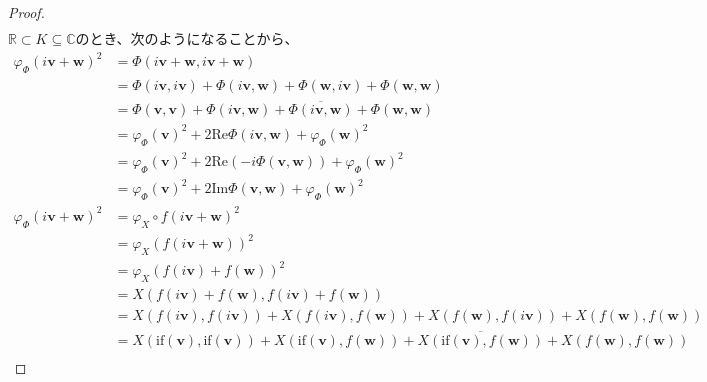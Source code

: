 \documentclass[dvipdfmx]{jsarticle}
\begin{document}
\begin{proof}
\begin{align*}
\end{align*}
$\mathbb{R} \subset K \subseteq \mathbb{C}$のとき、次のようになることから、
\begin{align*}
{\varphi_{\varPhi }\left( i\mathbf{v} + \mathbf{w} \right)}^{2} &= \varPhi \left( i\mathbf{v} + \mathbf{w},i\mathbf{v} + \mathbf{w} \right)\\
&= \varPhi \left( i\mathbf{v},i\mathbf{v} \right) + \varPhi \left( i\mathbf{v},\mathbf{w} \right) + \varPhi \left( \mathbf{w},i\mathbf{v} \right) + \varPhi \left( \mathbf{w},\mathbf{w} \right)\\
&= \varPhi \left( \mathbf{v},\mathbf{v} \right) + \varPhi \left( i\mathbf{v},\mathbf{w} \right) + \overline{\varPhi \left( i\mathbf{v},\mathbf{w} \right)} + \varPhi \left( \mathbf{w},\mathbf{w} \right)\\
&= {\varphi_{\varPhi }\left( \mathbf{v} \right)}^{2} + 2\mathrm{Re}{\varPhi \left( i\mathbf{v},\mathbf{w} \right)} + {\varphi_{\varPhi }\left( \mathbf{w} \right)}^{2}\\
&= {\varphi_{\varPhi }\left( \mathbf{v} \right)}^{2} + 2\mathrm{Re}\left( - i\varPhi \left( \mathbf{v},\mathbf{w} \right) \right) + {\varphi_{\varPhi }\left( \mathbf{w} \right)}^{2}\\
&= {\varphi_{\varPhi }\left( \mathbf{v} \right)}^{2} + 2\mathrm{Im}{\varPhi \left( \mathbf{v},\mathbf{w} \right)} + {\varphi_{\varPhi }\left( \mathbf{w} \right)}^{2}\\
{\varphi_{\varPhi }\left( i\mathbf{v} + \mathbf{w} \right)}^{2} &= {\varphi_{X} \circ f\left( i\mathbf{v} + \mathbf{w} \right)}^{2}\\
&= {\varphi_{X}\left( f\left( i\mathbf{v} + \mathbf{w} \right) \right)}^{2}\\
&= {\varphi_{X}\left( f\left( i\mathbf{v} \right) + f\left( \mathbf{w} \right) \right)}^{2}\\
&= X\left( f\left( i\mathbf{v} \right) + f\left( \mathbf{w} \right),f\left( i\mathbf{v} \right) + f\left( \mathbf{w} \right) \right)\\
&= X\left( f\left( i\mathbf{v} \right),f\left( i\mathbf{v} \right) \right) + X\left( f\left( i\mathbf{v} \right),f\left( \mathbf{w} \right) \right) + X\left( f\left( \mathbf{w} \right),f\left( i\mathbf{v} \right) \right) + X\left( f\left( \mathbf{w} \right),f\left( \mathbf{w} \right) \right)\\
&= X\left( \mathrm{if}\left( \mathbf{v} \right),\mathrm{if}\left( \mathbf{v} \right) \right) + X\left( \mathrm{if}\left( \mathbf{v} \right),f\left( \mathbf{w} \right) \right) + \overline{X\left( \mathrm{if}\left( \mathbf{v} \right),f\left( \mathbf{w} \right) \right)} + X\left( f\left( \mathbf{w} \right),f\left( \mathbf{w} \right) \right)\\

\end{align*}
\end{proof}
\end{document}
